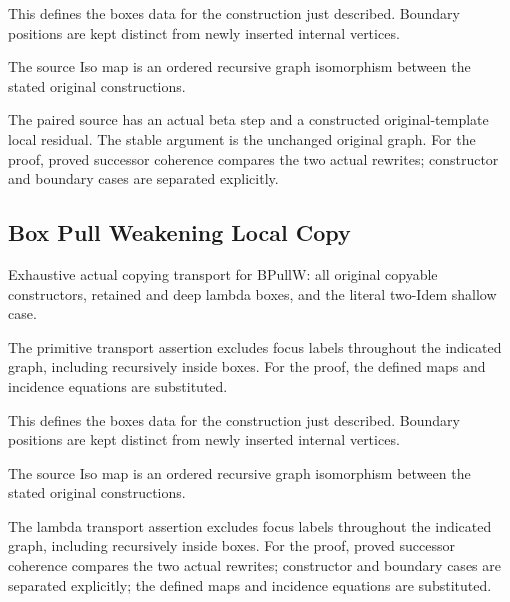 This defines the boxes data for the construction just described. Boundary positions are kept distinct from newly inserted internal vertices.
\par{}

The source Iso map is an ordered recursive graph isomorphism between the stated original constructions.
\par{}

The paired source has an actual beta step and a constructed original-template local residual. The stable argument is the unchanged original graph.
For the proof, proved successor coherence compares the two actual rewrites; constructor and boundary cases are separated explicitly.
\par{}

\subsection{Box Pull Weakening Local Copy}
Exhaustive actual copying transport for BPullW: all original copyable constructors, retained and deep lambda boxes, and the literal two-Idem shallow case.

The primitive transport assertion excludes focus labels throughout the indicated graph, including recursively inside boxes.
For the proof, the defined maps and incidence equations are substituted.
\par{}

This defines the boxes data for the construction just described. Boundary positions are kept distinct from newly inserted internal vertices.
\par{}

The source Iso map is an ordered recursive graph isomorphism between the stated original constructions.
\par{}

The lambda transport assertion excludes focus labels throughout the indicated graph, including recursively inside boxes.
For the proof, proved successor coherence compares the two actual rewrites; constructor and boundary cases are separated explicitly; the defined maps and incidence equations are substituted.
\par{}

